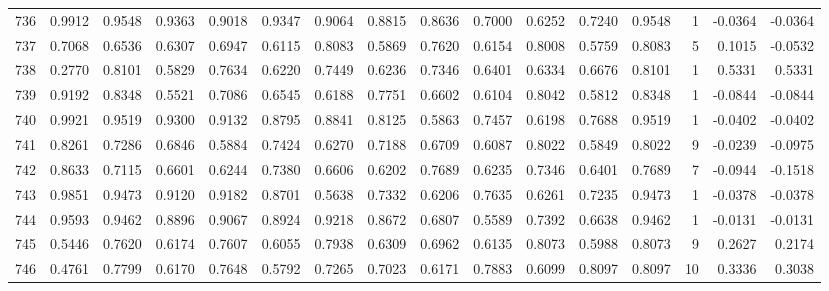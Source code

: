 \begin{tabular}{lrrrrrrrrrrrrrrr}
736 &      0.9912 &  0.9548 &  0.9363 &  0.9018 &  0.9347 &  0.9064 &  0.8815 &  0.8636 &  0.7000 &  0.6252 &   0.7240 &     0.9548 &      1 &                   -0.0364 &                    -0.0364 \\
737 &      0.7068 &  0.6536 &  0.6307 &  0.6947 &  0.6115 &  0.8083 &  0.5869 &  0.7620 &  0.6154 &  0.8008 &   0.5759 &     0.8083 &      5 &                    0.1015 &                    -0.0532 \\
738 &      0.2770 &  0.8101 &  0.5829 &  0.7634 &  0.6220 &  0.7449 &  0.6236 &  0.7346 &  0.6401 &  0.6334 &   0.6676 &     0.8101 &      1 &                    0.5331 &                     0.5331 \\
739 &      0.9192 &  0.8348 &  0.5521 &  0.7086 &  0.6545 &  0.6188 &  0.7751 &  0.6602 &  0.6104 &  0.8042 &   0.5812 &     0.8348 &      1 &                   -0.0844 &                    -0.0844 \\
740 &      0.9921 &  0.9519 &  0.9300 &  0.9132 &  0.8795 &  0.8841 &  0.8125 &  0.5863 &  0.7457 &  0.6198 &   0.7688 &     0.9519 &      1 &                   -0.0402 &                    -0.0402 \\
741 &      0.8261 &  0.7286 &  0.6846 &  0.5884 &  0.7424 &  0.6270 &  0.7188 &  0.6709 &  0.6087 &  0.8022 &   0.5849 &     0.8022 &      9 &                   -0.0239 &                    -0.0975 \\
742 &      0.8633 &  0.7115 &  0.6601 &  0.6244 &  0.7380 &  0.6606 &  0.6202 &  0.7689 &  0.6235 &  0.7346 &   0.6401 &     0.7689 &      7 &                   -0.0944 &                    -0.1518 \\
743 &      0.9851 &  0.9473 &  0.9120 &  0.9182 &  0.8701 &  0.5638 &  0.7332 &  0.6206 &  0.7635 &  0.6261 &   0.7235 &     0.9473 &      1 &                   -0.0378 &                    -0.0378 \\
744 &      0.9593 &  0.9462 &  0.8896 &  0.9067 &  0.8924 &  0.9218 &  0.8672 &  0.6807 &  0.5589 &  0.7392 &   0.6638 &     0.9462 &      1 &                   -0.0131 &                    -0.0131 \\
745 &      0.5446 &  0.7620 &  0.6174 &  0.7607 &  0.6055 &  0.7938 &  0.6309 &  0.6962 &  0.6135 &  0.8073 &   0.5988 &     0.8073 &      9 &                    0.2627 &                     0.2174 \\
746 &      0.4761 &  0.7799 &  0.6170 &  0.7648 &  0.5792 &  0.7265 &  0.7023 &  0.6171 &  0.7883 &  0.6099 &   0.8097 &     0.8097 &     10 &                    0.3336 &                     0.3038 \\

\end{tabular}
